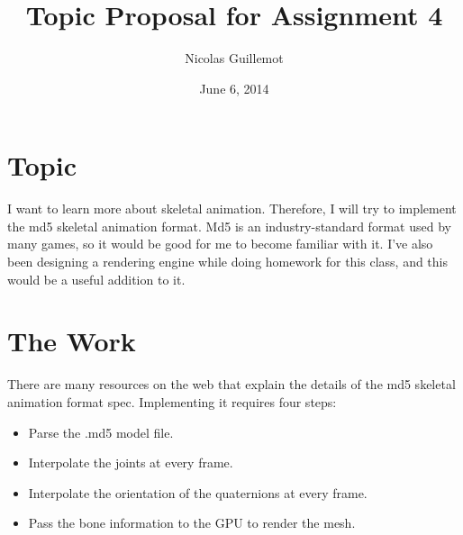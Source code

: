 \documentclass{article}
\begin{document}
\title{Topic Proposal for Assignment 4}
\date{June 6, 2014}
\author{Nicolas Guillemot}
\maketitle

\section*{Topic}

I want to learn more about skeletal animation. Therefore, I will try to implement the md5 skeletal animation format. Md5 is an industry-standard format used by many games, so it would be good for me to become familiar with it. I've also been designing a rendering engine while doing homework for this class, and this would be a useful addition to it.

\section*{The Work}

There are many resources on the web that explain the details of the md5 skeletal animation format spec. Implementing it requires four steps:

\begin{itemize}
    \item Parse the .md5 model file.
    \item Interpolate the joints at every frame.
    \item Interpolate the orientation of the quaternions at every frame.
    \item Pass the bone information to the GPU to render the mesh.
\end{itemize}
\end{document}
